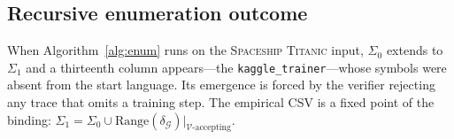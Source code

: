 \subsection{Recursive enumeration outcome}

When Algorithm~\ref{alg:enum} runs on the \textsc{Spaceship Titanic}
input, $\Sigma_0$ extends to $\Sigma_1$ and a thirteenth column
appears---the \texttt{kaggle\_trainer}---whose symbols were absent
from the start language.  Its emergence is forced by the verifier
rejecting any trace that omits a training step.  The empirical CSV
is a fixed point of the binding:
$\Sigma_1 = \Sigma_0 \cup \mathrm{Range}(\delta_\mathcal{G})\big|_{\mathcal{V}\text{-accepting}}$.
